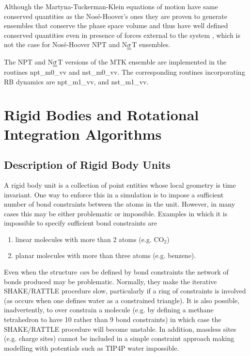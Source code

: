 Although the Martyna-Tuckerman-Klein equations of motion have same
conserved quantities as the Nos\'e-Hoover's ones they are proven
to generate ensembles that conserve the phase space volume and
thus have well defined conserved quantities even in presence of
forces external to the system \cite{martyna-94a}, which is not
the case for Nos\'{e}-Hoover NPT and N$\mbox{$\underline{\underline{\bf \sigma}}$}$T ensembles.

The NPT and N$\mbox{$\underline{\underline{\bf \sigma}}$}$T versions of the MTK ensemble are
implemented in the \D routines {\sc npt\_m0\_vv} and
{\sc nst\_m0\_vv}. The corresponding routines incorporating RB dynamics are
{\sc npt\_m1\_vv}, and {\sc nst\_m1\_vv}.

\section{Rigid Bodies and Rotational Integration Algorithms}
\label{rigid}

\subsection{Description of Rigid Body Units}

A rigid body unit is a collection of point entities whose local geometry
is time invariant.  One way to enforce this in a simulation is to
impose a sufficient number of bond constraints between the atoms in
the unit.  However, in many cases this may be either problematic or
impossible.  Examples in which it is impossible to specify sufficient
bond constraints are
\begin{enumerate}
\item linear molecules with more than 2 atoms (e.g. CO$_2$)
\item planar molecules with more than three atoms (e.g. benzene).
\end{enumerate}
Even when the structure {\em can} be defined by bond
constraints the network of bonds produced
may be problematic.  Normally, they make the iterative SHAKE/RATTLE procedure slow,
particularly if a ring of constraints is involved (as occurs when
one defines water as a constrained triangle).  It is also possible,
inadvertently, to over constrain a molecule (e.g. by defining a
methane tetrahedron to have 10 rather than 9 bond constraints)
in which case the SHAKE/RATTLE procedure will become unstable.
In addition, massless sites (e.g. charge sites) cannot be included
in a simple constraint approach making modelling with potentials
such as TIP4P water impossible.

